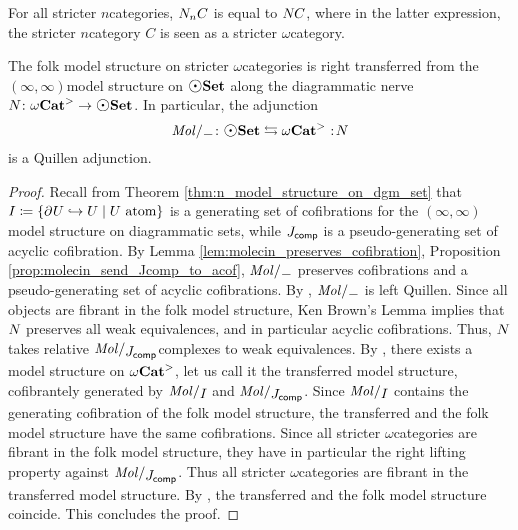 \begin{rmk}
    For all stricter \( n \)\nbd categories, \( N_{n} C \) is equal to \( N_{} C \), where in the latter expression, the stricter \( n \)\nbd category \( C \) is seen as a stricter \( \omega \)\nbd category.
\end{rmk}


\begin{prop} \label{prop:quillen_folk_dgm_infty}
    The folk model structure on stricter \( \omega \)\nbd categories is right transferred from the \( (\infty, \infty) \)\nbd model structure on \( \dgmSet \) along the diagrammatic nerve \( \N{} \colon \somegaCat \to \dgmSet \).
    In particular, the adjunction 
    \begin{equation*}
        \molecin{-} \colon \dgmSet \leftrightarrows \somegaCat \cocolon \N{}
    \end{equation*}
    is a Quillen adjunction.
\end{prop}
\begin{proof}
    Recall from Theorem \ref{thm:n_model_structure_on_dgm_set} that \( I \coloneqq \left\{ {\partial_{}^{} U \hookrightarrow U \mid U \text{ atom}} \right\} \) is a generating set of cofibrations for the \( (\infty, \infty) \)\nbd model structure on diagrammatic sets, while \( J_{\mathsf{comp}} \) is a pseudo-generating set of acyclic cofibration. 
    By Lemma \ref{lem:molecin_preserves_cofibration}, Proposition \ref{prop:molecin_send_Jcomp_to_acof}, \( \molecin{-} \) preserves cofibrations and a pseudo-generating set of acyclic cofibrations.
    By \cite[E.2.14]{joyal2008theory}, \( \molecin{-} \) is left Quillen. 
    Since all objects are fibrant in the folk model structure, Ken Brown's Lemma implies that \( N_{} \) preserves all weak equivalences, and in particular acyclic cofibrations. 
    Thus, \( N_{} \) takes relative \( \molecin{\Jcomp} \)\nbd complexes to weak equivalences.
    By \cite[Theorem 11.3.2]{hirschhorn2003model}, there exists a model structure on \( {\omega\mathbf{Cat}}^> \), let us call it the transferred model structure, cofibrantely generated by \( \molecin{I} \) and \( \molecin{\Jcomp} \).
    Since \( \molecin{I} \) contains the generating cofibration of the folk model structure, the transferred and the folk model structure have the same cofibrations.
    Since all stricter \( \omega \)\nbd categories are fibrant in the folk model structure, they have in particular the right lifting property against \( \molecin{\Jcomp} \).
    Thus all stricter \( \omega \)\nbd categories are fibrant in the transferred model structure.
    By \cite[Proposition E.1.10]{joyal2008theory}, the transferred and the folk model structure coincide.
    This concludes the proof.
\end{proof}

